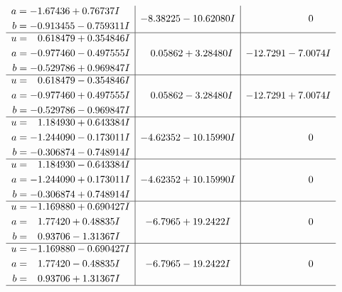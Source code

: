 \documentclass[1p]{elsarticle_modified}
\theoremstyle{definition}
\begin{document}
$$\begin{array}{c|c|c}
\begin{aligned}
a &= -1.67436 + 0.76737 I \\
b &= -0.913455 - 0.759311 I\end{aligned}
 & -8.38225 - 10.62080 I & \phantom{-0.000000 } 0 \\ \hline\begin{aligned}
u &= \phantom{-}0.618479 + 0.354846 I \\
a &= -0.977460 - 0.497555 I \\
b &= -0.529786 + 0.969847 I\end{aligned}
 & \phantom{-}0.05862 + 3.28480 I & -12.7291 - 7.0074 I \\ \hline\begin{aligned}
u &= \phantom{-}0.618479 - 0.354846 I \\
a &= -0.977460 + 0.497555 I \\
b &= -0.529786 - 0.969847 I\end{aligned}
 & \phantom{-}0.05862 - 3.28480 I & -12.7291 + 7.0074 I \\ \hline\begin{aligned}
u &= \phantom{-}1.184930 + 0.643384 I \\
a &= -1.244090 - 0.173011 I \\
b &= -0.306874 - 0.748914 I\end{aligned}
 & -4.62352 - 10.15990 I & \phantom{-0.000000 } 0 \\ \hline\begin{aligned}
u &= \phantom{-}1.184930 - 0.643384 I \\
a &= -1.244090 + 0.173011 I \\
b &= -0.306874 + 0.748914 I\end{aligned}
 & -4.62352 + 10.15990 I & \phantom{-0.000000 } 0 \\ \hline\begin{aligned}
u &= -1.169880 + 0.690427 I \\
a &= \phantom{-}1.77420 + 0.48835 I \\
b &= \phantom{-}0.93706 - 1.31367 I\end{aligned}
 & -6.7965 + 19.2422 I & \phantom{-0.000000 } 0 \\ \hline\begin{aligned}
u &= -1.169880 - 0.690427 I \\
a &= \phantom{-}1.77420 - 0.48835 I \\
b &= \phantom{-}0.93706 + 1.31367 I\end{aligned}
 & -6.7965 - 19.2422 I & \phantom{-0.000000 } 0\\
 \hline 
 \end{array}$$\newpage$$\begin{array}{c|c|c}  

\end{array}$$
\end{document}
